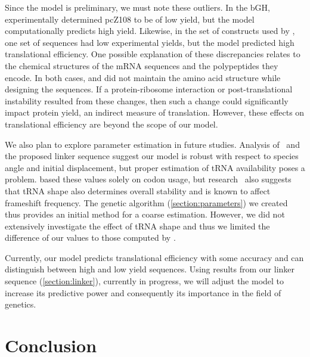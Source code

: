 \documentclass[12pt]{article}
\begin{document}
Since the model is preliminary, we must note these outliers.  In the
bGH, \citeauthor{schoner:bgh} experimentally determined pcZ108 to be
of low yield, but the model computationally predicts high yield.
Likewise, in the set of constructs used by \citet{weiss87}, one
set of sequences had low experimental yields, but the model predicted high translational efficiency.  One
possible explanation of these discrepancies relates to the chemical
structures of the mRNA sequences and the polypeptides they
encode.  In both cases, \citeauthor{weiss87} and
\citeauthor{schoner:bgh} did not maintain the amino
acid structure while designing the sequences. If a protein-ribosome
interaction or post-translational instability resulted from these
changes, then such a change could significantly impact protein yield, an
indirect measure of translation. However, these effects on
translational efficiency are beyond the scope of our model.

We also plan to explore parameter estimation in future studies.
Analysis of \prfB\ and the
proposed linker sequence suggest our model is robust with respect to species angle
and initial displacement, but proper estimation of tRNA availability
poses a problem. \citet{lalit:mechanics} based these values solely on 
codon usage, but research~\cite{phelps} also suggests that tRNA shape
also determines overall stability and is known to affect
frameshift frequency. The
genetic algorithm (\autoref{section:parameters}) we created thus
provides an initial method for a coarse estimation. However, we did
not extensively investigate the effect of tRNA shape and thus we limited the
difference of our values to those computed by \citeauthor{lalit:mechanics}.

Currently, our model predicts translational efficiency with some
accuracy and can distinguish between high and low yield sequences. 
Using results from our linker sequence (\autoref{section:linker}), 
currently in progress, we will adjust the model to increase its 
predictive power and consequently its importance in the field of 
genetics.

\section{Conclusion}
\label{section:conclusion}
\end{document}
